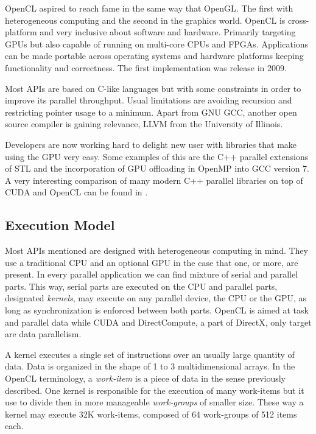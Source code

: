 \documentclass{article}
\begin{document}
OpenCL aspired to reach fame in the same way that OpenGL. The first with heterogeneous computing and the second in the graphics world. OpenCL is cross-platform and very inclusive about software and hardware. Primarily targeting GPUs but also capable of running on multi-core CPUs and FPGAs. Applications can be made portable across operating systems and hardware platforms keeping functionality and correctness. The first implementation was release in 2009.

Most APIs are based on C-like languages but with some constraints in order to improve its parallel throughput. Usual limitations are avoiding recursion and restricting pointer usage to a minimum. Apart from GNU GCC, another open source compiler is gaining relevance, LLVM \cite{LLVM} from the University of Illinois.

Developers are now working hard to delight new user with libraries that make using the GPU very easy. Some examples of this are the C++ parallel extensions of STL and the incorporation of GPU offloading in OpenMP into GCC version 7. A very interesting comparison of many modern C++ parallel libraries on top of CUDA and OpenCL can be found in \cite{doi:10.1137/120903683}.

\subsection{Execution Model}

Most APIs mentioned are designed with heterogeneous computing in
mind. They use a traditional CPU and an optional GPU in the case that
one, or more, are present. In every parallel application we can find
mixture of serial and parallel parts. This way, serial parts are
executed on the CPU and parallel parts, designated \textit{kernels},
may execute on any parallel device, the CPU or the GPU, as long as
synchronization is enforced between both parts. OpenCL is aimed at
task and parallel data while CUDA and DirectCompute, a part of
DirectX, only target are data parallelism. 

A kernel executes a single set of instructions over an usually large
quantity of data. Data is organized in the shape of 1 to 3
multidimensional arrays. In the OpenCL terminology, a
\textit{work-item} is a 
piece of data in the sense previously described. One kernel is
responsible for the execution of many work-items but it use to divide
then in more manageable \textit{work-groups} of smaller size. These
way a kernel may execute 32K work-items, composed of 64 work-groups of
512 items each. 
\end{document}
